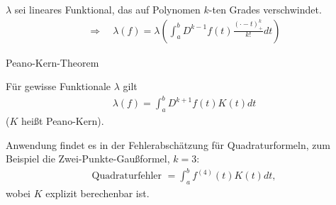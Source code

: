 $\lambda$ sei lineares Funktional, das auf Polynomen $k$-ten Grades verschwindet. 
\begin{align*}
  \Rightarrow \quad  \lambda(f) = \lambda\left( \int_a^bD^{k-1}f(t) \frac{(\cdot - t)^k_+}{k!}dt \right)
\end{align*}
\begin{theorem} Peano-Kern-Theorem
  
Für gewisse Funktionale $\lambda$ gilt 
\begin{align*}
  \lambda(f)= \int_a^bD^{k+1}f(t)K(t)dt
\end{align*}
($K$ heißt Peano-Kern).
\end{theorem}
Anwendung findet es in der Fehlerabschätzung für Quadraturformeln, zum Beispiel die Zwei-Punkte-Gaußformel, $k = 3$: 
\begin{align*}
  \text{Quadraturfehler } = \int_a^bf^{(4)}(t)K(t)dt,
\end{align*}
wobei $K$ explizit berechenbar ist.

